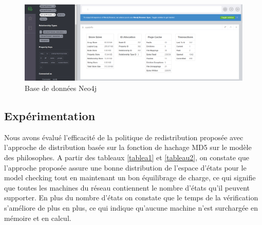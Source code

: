 \begin{figure} 
	\centering
	\includegraphics[width=1\linewidth]{img/bddneo4j}
	\caption{Base de données Neo4j} 
\end{figure}
\pagebreak
\subsection{Expérimentation}
Nous avons évalué l’efficacité de la politique de redistribution proposée avec l’approche de distribution basée sur la fonction de hachage MD5 sur le modèle des philosophes. A partir des tableaux \ref{tablea1} et \ref{tableau2}, on constate que l’approche proposée assure une bonne distribution de l'espace d'états pour le model checking tout en maintenant un bon équilibrage de charge, ce qui signifie que toutes les machines du réseau contiennent le nombre d'états qu'il peuvent supporter. En plus du nombre d'états on constate que le temps de la vérification s'améliore de plus en plus, ce qui indique qu’aucune machine n’est surchargée en mémoire et en calcul.

